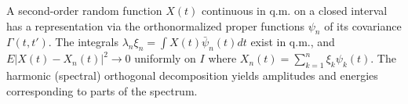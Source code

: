 A second-order random function $X(t)$ continuous in q.m. on a closed interval has a representation via the orthonormalized proper functions $\psi_n$ of its covariance $\Gamma(t, t')$. The integrals $\lambda_n \xi_n = \int X(t) \bar{\psi}_n(t) dt$ exist in q.m., and $E |X(t) - X_n(t)|^2 \to 0$ uniformly on $I$ where $X_n(t) = \sum_{k=1}^{n} \xi_k \psi_k(t)$. The harmonic (spectral) orthogonal decomposition yields amplitudes and energies corresponding to parts of the spectrum.
